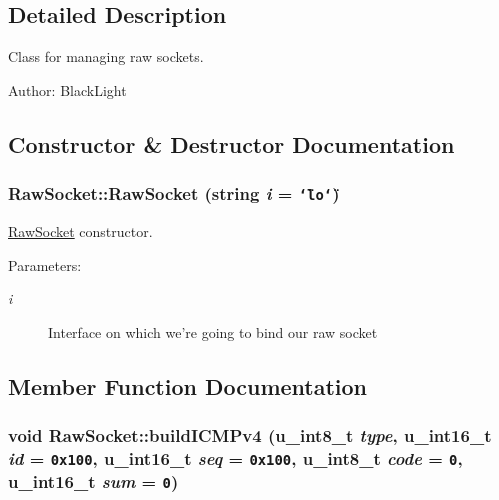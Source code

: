 \subsection{Detailed Description}
Class for managing raw sockets. 

\begin{Desc}
\item[Author:]BlackLight \end{Desc}


\subsection{Constructor \& Destructor Documentation}
\hypertarget{classRawSocket_482e84c15438bb5b83d884f969d21e57}{
\subsubsection[{RawSocket}]{\setlength{\rightskip}{0pt plus 5cm}RawSocket::RawSocket (string {\em i} = {\tt \char`\"{}lo\char`\"{}})}}
\label{classRawSocket_482e84c15438bb5b83d884f969d21e57}


\hyperlink{classRawSocket}{RawSocket} constructor. 

\begin{Desc}
\item[Parameters:]
\begin{description}
\item[{\em i}]Interface on which we're going to bind our raw socket \end{description}
\end{Desc}


\subsection{Member Function Documentation}
\hypertarget{classRawSocket_07d676b2f5becf9fad465b7f63f9d3a3}{
\subsubsection[{buildICMPv4}]{\setlength{\rightskip}{0pt plus 5cm}void RawSocket::buildICMPv4 (u\_\-int8\_\-t {\em type}, \/  u\_\-int16\_\-t {\em id} = {\tt 0x100}, \/  u\_\-int16\_\-t {\em seq} = {\tt 0x100}, \/  u\_\-int8\_\-t {\em code} = {\tt 0}, \/  u\_\-int16\_\-t {\em sum} = {\tt 0})}}
\label{classRawSocket_07d676b2f5becf9fad465b7f63f9d3a3}


